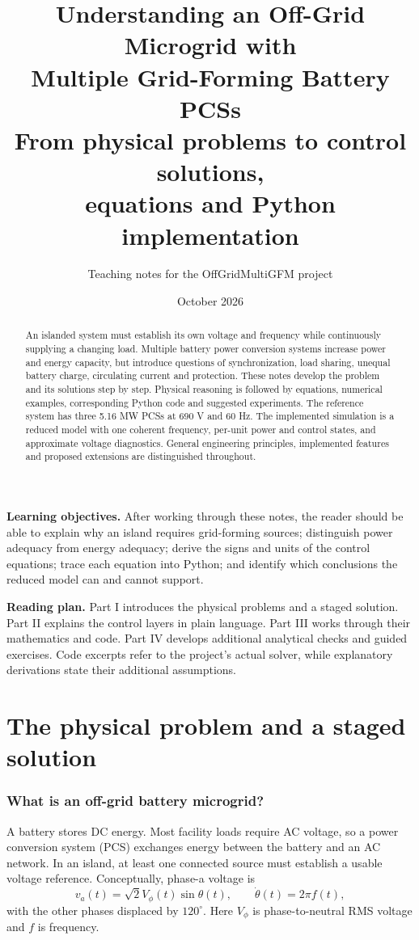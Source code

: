 \documentclass[11pt,a4paper]{article}
\title{Understanding an Off-Grid Microgrid with\\Multiple Grid-Forming Battery PCSs\\\large From physical problems to control solutions,\\equations and Python implementation}
\author{Teaching notes for the OffGridMultiGFM project}
\date{October 2026}
\begin{document}
\maketitle
\begin{abstract}
An islanded system must establish its own voltage and frequency while continuously supplying a changing load. Multiple battery power conversion systems increase power and energy capacity, but introduce questions of synchronization, load sharing, unequal battery charge, circulating current and protection. These notes develop the problem and its solutions step by step. Physical reasoning is followed by equations, numerical examples, corresponding Python code and suggested experiments. The reference system has three 5.16 MW PCSs at 690 V and 60 Hz. The implemented simulation is a reduced model with one coherent frequency, per-unit power and control states, and approximate voltage diagnostics. General engineering principles, implemented features and proposed extensions are distinguished throughout.
\end{abstract}
\textbf{Learning objectives.} After working through these notes, the reader should be able to explain why an island requires grid-forming sources; distinguish power adequacy from energy adequacy; derive the signs and units of the control equations; trace each equation into Python; and identify which conclusions the reduced model can and cannot support.

\textbf{Reading plan.} Part I introduces the physical problems and a staged solution. Part II explains the control layers in plain language. Part III works through their mathematics and code. Part IV develops additional analytical checks and guided exercises. Code excerpts refer to the project's actual solver, while explanatory derivations state their additional assumptions.
\tableofcontents
\clearpage
\part{The physical problem and a staged solution}

\section{What is an off-grid battery microgrid?}
A battery stores DC energy. Most facility loads require AC voltage, so a power conversion system (PCS) exchanges energy between the battery and an AC network. In an island, at least one connected source must establish a usable voltage reference. Conceptually, phase-a voltage is
\begin{equation}
v_a(t)=\sqrt{2}V_\phi(t)\sin\theta(t),\qquad \dot\theta(t)=2\pi f(t),
\end{equation}
with the other phases displaced by $120^\circ$. Here $V_\phi$ is phase-to-neutral RMS voltage and $f$ is frequency.
\end{document}

